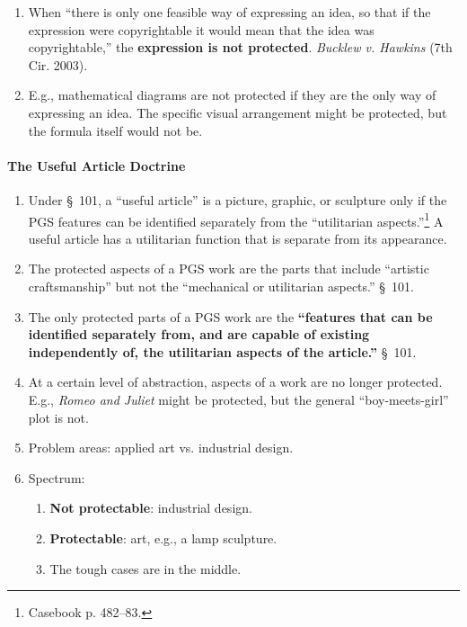 \begin{enumerate}
    \item When ``there is only one feasible way of expressing an idea, so that 
    if the expression were copyrightable it would mean that the idea was 
    copyrightable,'' the \textbf{expression is not protected}. \emph{Bucklew 
    v. Hawkins} (7th Cir. 2003).
    \item E.g., mathematical diagrams are not protected if they are the only 
    way of expressing an idea. The specific visual arrangement might be 
    protected, but the formula itself would not be.
\end{enumerate}

\paragraph{The Useful Article Doctrine}

\begin{enumerate}
    \item Under \S\ 101, a ``useful article'' is a picture, graphic, or 
    sculpture only if the PGS features can be identified separately from the 
    ``utilitarian aspects.''\footnote{Casebook p. 482--83.} A useful article 
    has a utilitarian function that is separate from its appearance.
    \item The protected aspects of a PGS work are the parts that include 
    ``artistic craftsmanship'' but not the ``mechanical or utilitarian 
    aspects.'' \S\ 101.
    \item The only protected parts of a PGS work are the \textbf{``features 
    that can be identified separately from, and are capable of existing 
    independently of, the utilitarian aspects of the article.''} \S\ 101.
    \item At a certain level of abstraction, aspects of a work are no longer 
    protected. E.g., \emph{Romeo and Juliet} might be protected, but the 
    general ``boy-meets-girl'' plot is not.
    \item Problem areas: applied art vs. industrial design.
    \item Spectrum:
    \begin{enumerate}
        \item \textbf{Not protectable}: industrial design.
        \item \textbf{Protectable}: art, e.g., a lamp sculpture.
        \item The tough cases are in the middle.
    \end{enumerate}
\end{enumerate}

